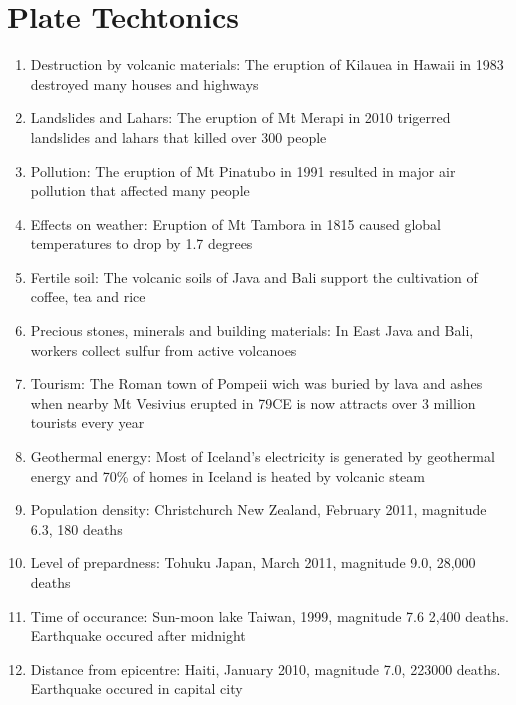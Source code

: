 \documentclass[oneside]{book}
\begin{document}
\newpage
\chapter{Plate Techtonics} \small
\begin{minipage}{0.5\textwidth}
  \begin{enumerate}
    \item Destruction by volcanic materials: The eruption of Kilauea in Hawaii in 1983 destroyed many houses and highways

    \item Landslides and Lahars: The eruption of Mt Merapi in 2010 trigerred landslides and lahars that killed over 300 people
    
    \item Pollution: The eruption of Mt Pinatubo in 1991 resulted in major air pollution that affected many people
    
    \item Effects on weather: Eruption of Mt Tambora in 1815 caused global temperatures to drop by 1.7 degrees
    
    \item Fertile soil: The volcanic soils of Java and Bali support the cultivation of coffee, tea and rice
    
    \item Precious stones, minerals and building materials: In East Java and Bali, workers collect sulfur from active volcanoes
    
    \item Tourism: The Roman town of Pompeii wich was buried by lava and ashes when nearby Mt Vesivius erupted in 79CE is now attracts over 3 million tourists every year
    
    \item Geothermal energy: Most of Iceland’s electricity is generated by geothermal energy and 70\% of homes in Iceland is heated by volcanic steam
    
    \item Population density: Christchurch New Zealand, February 2011, magnitude 6.3, 180 deaths
    
    \item Level of prepardness: Tohuku Japan, March 2011, magnitude 9.0, 28,000 deaths
    
    \item Time of occurance: Sun-moon lake Taiwan, 1999, magnitude 7.6 2,400 deaths. Earthquake occured after midnight

    \item Distance from epicentre: Haiti, January 2010, magnitude 7.0, 223000 deaths. Earthquake occured in capital city
    

\end{enumerate}
\end{minipage}
\end{document}
